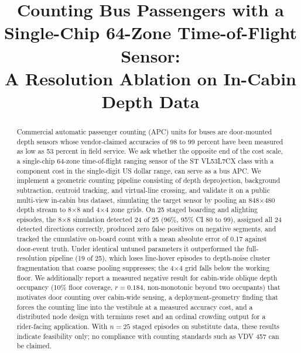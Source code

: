 \documentclass[conference]{IEEEtran}
\begin{document}
\title{Counting Bus Passengers with a Single-Chip 64-Zone Time-of-Flight Sensor:\\
A Resolution Ablation on In-Cabin Depth Data}

\author{
}

\maketitle

\begin{abstract}
Commercial automatic passenger counting (APC) units for buses are door-mounted
depth sensors whose vendor-claimed accuracies of 98 to 99 percent have been
measured as low as 53 percent in field service. We ask whether the opposite end
of the cost scale, a single-chip 64-zone time-of-flight ranging sensor of the
ST VL53L7CX class with a component cost in the single-digit US dollar range,
can serve as a bus APC. We implement a geometric counting pipeline consisting
of depth deprojection, background subtraction, centroid tracking, and
virtual-line crossing, and validate it on a public multi-view in-cabin bus
dataset, simulating the target sensor by pooling an 848$\times$480 depth
stream to 8$\times$8 and 4$\times$4 zone grids. On 25 staged boarding and
alighting episodes, the 8$\times$8 simulation detected 24 of 25 (96\%, 95\% CI
80 to 99), assigned all 24 detected directions correctly, produced zero false
positives on negative segments, and tracked the cumulative on-board count with
a mean absolute error of 0.17 against door-event truth. Under identical
untuned parameters it outperformed the full-resolution pipeline (19 of 25),
which loses line-hover episodes to depth-noise cluster fragmentation that
coarse pooling suppresses; the 4$\times$4 grid falls below the working floor.
We additionally report a measured negative result for cabin-wide oblique depth
occupancy (10\% floor coverage, $r=0.184$, non-monotonic beyond two occupants)
that motivates door counting over cabin-wide sensing, a deployment-geometry
finding that forces the counting line into the vestibule at a measured
accuracy cost, and a distributed node design with terminus reset and an
ordinal crowding output for a rider-facing application. With $n=25$ staged
episodes on substitute data, these results indicate feasibility only; no
compliance with counting standards such as VDV 457 can be claimed.
\end{abstract}
\end{document}
